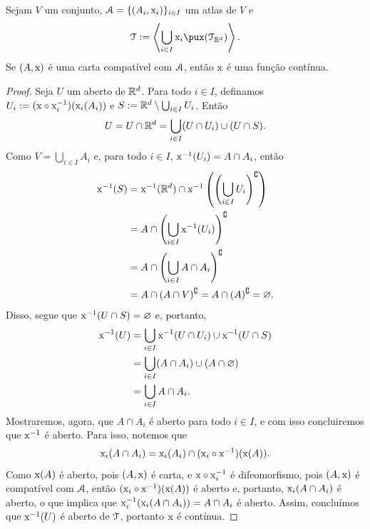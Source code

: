 \begin{prop}
Sejam $V$ um conjunto, $\mathcal{A}=\{(A_i,\mathrm{x}_i)\}_{i \in I}$ um atlas de $V$ e
	\begin{equation*}
	\topo := \ger{\bigcup_{i \in I} {\x_i}\pux(\topo_{\R^d})}.
	\end{equation*}
Se $(A,\mathrm{x})$ é uma carta compatível com $\mathcal{A}$, então $\mathrm{x}$ é uma função contínua.
\end{prop}
\begin{proof}
Seja $U$ um aberto de $\mathbb{R}^d$. Para todo $i \in I$, definamos $U_i := (\mathrm{x} \circ \mathrm{x}_i^{-1})(\mathrm{x}_i(A_i))$ e $S := \mathbb{R}^d \setminus \bigcup_{i \in I} U_i$. Então
	\begin{equation*}
	U = U \cap \mathbb{R}^d = \bigcup_{i \in I} (U \cap U_i) \cup (U \cap S).
	\end{equation*}
Como $V=\bigcup_{i \in I} A_i$ e, para todo $i \in I$, $\mathrm{x}^{-1}(U_i) = A \cap A_i$, então
	\begin{align*}
	\mathrm{x}^{-1}(S) &= \mathrm{x}^{-1}(\mathbb{R}^d) \cap \mathrm{x}^{-1}\left(\left(\bigcup_{i \in I} U_i\right)^\complement\right) \\
		&= A \cap \left(\bigcup_{i \in I} \mathrm{x}^{-1}(U_i) \right)^\complement \\
		&= A \cap \left(\bigcup_{i \in I} A \cap A_i \right)^\complement \\
		&= A \cap (A \cap V)^\complement = A \cap (A)^\complement = \varnothing.
	\end{align*}
Disso, segue que $\mathrm{x}^{-1}(U \cap S)=\varnothing$ e, portanto,
	\begin{align*}
	\mathrm{x}^{-1}(U) &= \bigcup_{i \in I} \mathrm{x}^{-1}(U \cap U_i) \cup \mathrm{x}^{-1}(U \cap S) \\
		&= \bigcup_{i \in I} (A \cap A_i) \cup (A \cap\varnothing) \\
		&= \bigcup_{i \in I} A \cap A_i.
	\end{align*}
Mostraremos, agora, que $A \cap A_i$ é aberto para todo $i \in I$, e com isso concluiremos que $\mathrm{x}^{-1}$ é aberto. Para isso, notemos que
	\begin{equation*}
	\mathrm{x}_i(A \cap A_i) = \mathrm{x}_i(A_i) \cap (\mathrm{x}_i \circ \mathrm{x}^{-1})(\mathrm{x}(A)).
	\end{equation*}
Como $\mathrm{x}(A)$ é aberto, pois $(A,\mathrm{x})$ é carta, e $\mathrm{x} \circ \mathrm{x}_i^{-1}$ é difeomorfismo, pois $(A,\mathrm{x})$ é compatível com $\mathcal{A}$, então $(\mathrm{x}_i \circ \mathrm{x}^{-1})(\mathrm{x}(A))$ é aberto e, portanto, $\mathrm{x}_i(A \cap A_i)$ é aberto, o que implica que $\mathrm{x}_i^{-1}(\mathrm{x}_i(A \cap A_i)) = A \cap A_i$ é aberto. Assim, concluímos que $\mathrm{x}^{-1}(U)$ é aberto de $\mathcal{T}$, portanto $\mathrm{x}$ é contínua.
\end{proof}


